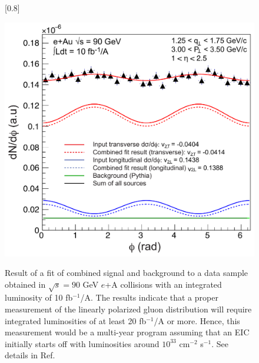 \begin{figure}[b]

[0.8\linewidth]
{
\caption{Result of a fit of combined signal and background to a data sample obtained
	in $\sqrt{s}=90$ GeV $e$+A collisions with an integrated luminosity of 10 fb$^{-1}$/A.
	The results indicate that a proper measurement of
the linearly polarized gluon distribution will require integrated
luminosities of at least 20 fb$^{-1}$/A or more. Hence, this
measurement would be a multi-year program assuming that an EIC
initially starts off with luminosities around $10^{33}$ cm$^{-2}$
s$^{-1}$. See details in Ref.~\cite{TODO}
	}
	\label{fig:extract}
}
{ \includegraphics[width=\linewidth]{./figures/extract.pdf}
 }
\end{figure} 


